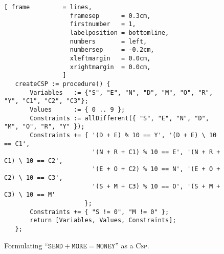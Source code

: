 \begin{figure}[!ht]
\centering
\begin{Verbatim}[ frame         = lines, 
                  framesep      = 0.3cm, 
                  firstnumber   = 1,
                  labelposition = bottomline,
                  numbers       = left,
                  numbersep     = -0.2cm,
                  xleftmargin   = 0.0cm,
                  xrightmargin  = 0.0cm,
                ]
   createCSP := procedure() {
       Variables   := {"S", "E", "N", "D", "M", "O", "R", "Y", "C1", "C2", "C3"};
       Values      := { 0 .. 9 };
       Constraints := allDifferent({ "S", "E", "N", "D", "M", "O", "R", "Y" });
       Constraints += { '(D + E) % 10 == Y', '(D + E) \ 10 == C1',
                        '(N + R + C1) % 10 == E', '(N + R + C1) \ 10 == C2',
                        '(E + O + C2) % 10 == N', '(E + O + C2) \ 10 == C3',
                        '(S + M + C3) % 10 == O', '(S + M + C3) \ 10 == M'
                      };
       Constraints += { "S != 0", "M != 0" };
       return [Variables, Values, Constraints];
   };
\end{Verbatim}
\vspace*{-0.3cm}
\caption{Formulating ``$\texttt{SEND} + \texttt{MORE} = \texttt{MONEY}$'' as a \textsc{Csp}.}
\label{fig:send-more-money.stlx}
\end{figure}

